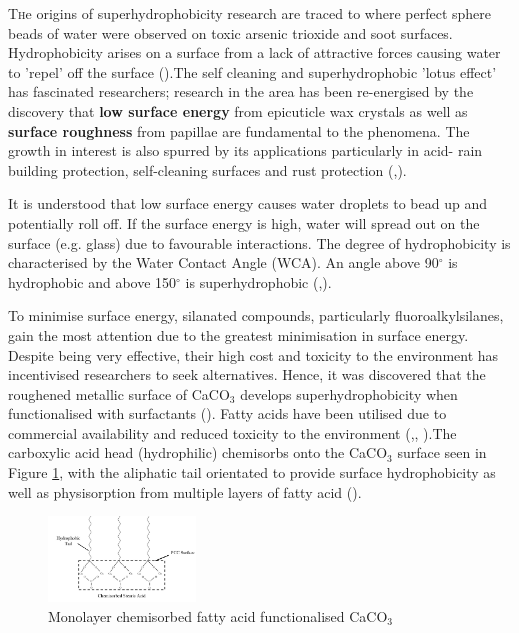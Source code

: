 \lettrine[nindent=0em,lines=2]{T}he origins of superhydrophobicity research are traced to \cite{ollivier_1907}  where perfect sphere beads of water were observed on toxic arsenic trioxide and soot surfaces. Hydrophobicity arises on a surface from a lack of attractive forces causing water to 'repel' off the surface (\cite{Hydrophobicreview}).The self cleaning and superhydrophobic 'lotus effect' has fascinated researchers; research in the area has been re-energised by the discovery that \textbf{low surface energy} from epicuticle wax crystals as well as \textbf{surface roughness} from papillae are fundamental to the phenomena. The growth in interest is also spurred by its applications particularly in acid- rain building protection, self-cleaning surfaces and rust protection (\cite{LATTHE201952},\cite{SHSreview}). 
\par It is understood that low surface energy causes water droplets to bead up and potentially roll off. If the surface energy is high, water will spread out on the surface (e.g. glass) due to favourable interactions. The degree of hydrophobicity is characterised by the Water Contact Angle (WCA). An angle above 90$^\circ$ is hydrophobic and above 150$^\circ$ is superhydrophobic (\cite{SHSreview},\cite{ECOSHS}). 
\par To minimise surface energy, silanated compounds, particularly fluoroalkylsilanes, gain the most attention due to the greatest minimisation in surface energy. Despite being very effective, their high cost and toxicity to the environment has incentivised researchers to seek alternatives. Hence, it was discovered that the roughened metallic surface of CaCO$_3$ develops superhydrophobicity when functionalised with surfactants (\cite{demjen}). Fatty acids have been utilised due to commercial availability and reduced toxicity to the environment (\cite{SHENG20061983},\cite{HuDeng}, \cite{Cao}).The carboxylic acid head (hydrophilic)  chemisorbs onto the CaCO$_3$ surface seen in Figure \ref{calcium}, with the aliphatic tail orientated to provide surface hydrophobicity as well as physisorption from multiple layers of fatty acid (\cite{Kokkinis_2017}). 

\begin{figure}[h!]
\centering
  \includegraphics[width=0.35\textwidth]{Sections/Figures/SAFunctionalised4.jpg}
  \caption{Monolayer chemisorbed fatty acid functionalised CaCO$_3$ }\label{calcium}
\end{figure}

